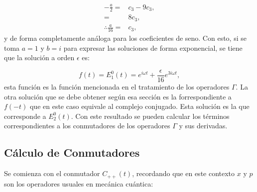 \documentclass[a4paper,10pt]{report}
\begin{document}
\begin{align*}
-\frac{a}{2} =& c_3 - 9c_3, \\
=& 8c_3, \\
\therefore \frac{a}{16} =& c_3,
\end{align*} y de forma completamente análoga para los coeficientes de seno. Con esto, si se toma $a=1$ y $b=i$ para expresar las soluciones de forma exponencial, se tiene que la solución a orden $\epsilon$ es:


\begin{equation}
f(t)= E_1^0(t) = e^{i\omega t} + \frac{\epsilon}{16} e^{3i\omega t},
\end{equation} esta función es la función mencionada en el tratamiento de los operadores $\Gamma$. La otra solución que se debe obtener según esa sección es la forrespondiente a $f(-t)$ que en este caso equivale al complejo conjugado. Esta solución es la que corresponde a $E_2^0(t)$. Con este resultado se pueden calcular los términos correspondientes a los conmutadores de los operadores $\Gamma$ y sus derivadas.

\subsection{Cálculo de Conmutadores}

Se comienza con el conmutador $C_{++}(t)$, recordando que en este contexto $x$ y $p$ son los operadores usuales en mecánica cuántica:
\end{document}
